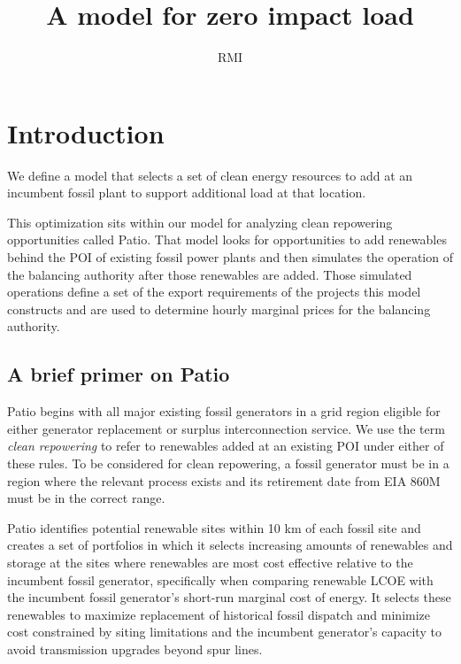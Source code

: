 \documentclass[9pt, oneside]{article}
\title{A model for zero impact load}
\author{RMI}
\numberwithin{equation}{subsubsection}
\begin{document}
\maketitle
\tableofcontents

\section{Introduction}\label{sec:introduction}
We define a model that selects a set of clean energy resources to add at an incumbent fossil plant to support additional load at that location.

This optimization sits within our model for analyzing clean repowering opportunities called Patio.
That model looks for opportunities to add renewables behind the POI of existing fossil power plants and then simulates the operation of the balancing authority after those renewables are added.
Those simulated operations define a set of the export requirements of the projects this model constructs and are used to determine hourly marginal prices for the balancing authority.

\subsection{A brief primer on Patio}
Patio begins with all major existing fossil generators in a grid region eligible for either generator replacement or surplus interconnection service.
We use the term \textit{clean repowering} to refer to renewables added at an existing POI under either of these rules.
To be considered for clean repowering, a fossil generator must be in a region where the relevant process exists and its retirement date from EIA 860M must be in the correct range.

Patio identifies potential renewable sites within 10 km of each fossil site and creates a
set of portfolios in which it selects increasing amounts of renewables and storage
at the sites where renewables are most cost effective relative to the incumbent fossil generator,
specifically when comparing renewable LCOE with the incumbent fossil generator's short-run marginal cost of energy.
It selects these renewables to maximize replacement of historical fossil dispatch
and minimize cost constrained by siting limitations and the incumbent generator’s
capacity to avoid transmission upgrades beyond spur lines.
\end{document}
